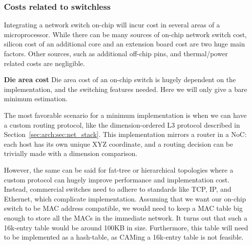 \subsubsection{Costs related to switchless}
Integrating a network switch on-chip will incur cost in several areas of a microprocessor. While there can be many sources of on-chip network switch cost, silicon cost of an additional core and an extension board cost are two huge main factors. Other sources, such as additional off-chip pins, and thermal/power related costs are negligible. 
\newcommand{\subsubsubsection}{\textbf}



\subsubsubsection{Die area cost}
Die area cost of an on-chip switch is hugely dependent on the implementation, and the switching features needed. Here we will only give a bare minimum estimation.

The most favorable scenario for a minimum implementation is when we can have a custom routing protocol, like the dimension-ordered L3 protocol described in Section~\ref{sec:arch:sec:net_stack}. This implementation mirrors a router in a NoC: each host has its own unique XYZ coordinate, and a routing decision can be trivially made with a dimension comparison.

However, the same can be said for fat-tree or hierarchical topologies where a custom protocol can hugely improve performance and implementation cost. Instead, commercial switches need to adhere to standards like TCP, IP, and Ethernet, which complicate implementation. Assuming that we want our on-chip switch to be MAC address compatible, we would need to keep a MAC table big enough to store all the MACs in the immediate network. It turns out that such a 16k-entry table would be around 100KB in size. Furthermore, this table will need to be implemented as a hash-table, as CAMing a 16k-entry table is not feasible.

